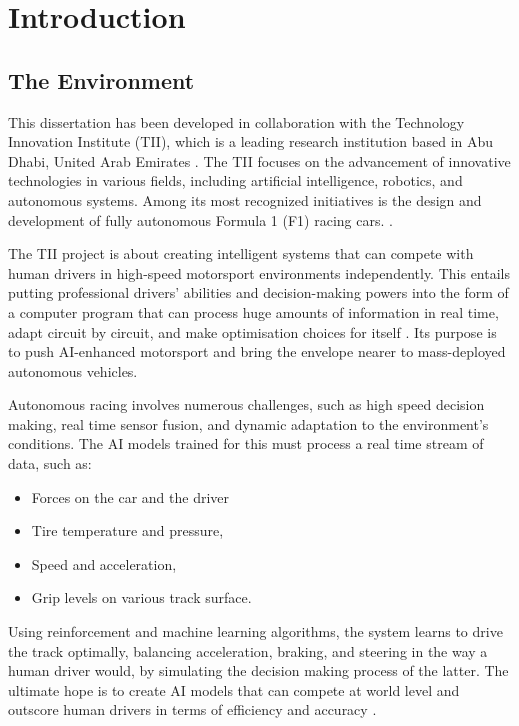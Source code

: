 \documentclass[a4paper,final,12pt]{report}
\begin{document}
\tableofcontents
\listoffigures
\listoftables
\setlength{\parindent}{0pt}

\chapter{Introduction}
\section{The Environment}
This dissertation has been developed in collaboration with the Technology Innovation Institute (TII), which is a leading research institution based in Abu Dhabi, United Arab Emirates \cite{TII}. The TII focuses on the advancement of innovative technologies in various fields, including artificial intelligence, robotics, and autonomous systems. Among its most recognized initiatives is the design and development of fully autonomous Formula 1 (F1) racing cars. \cite{AutonomousRacing}.

The TII project is about creating intelligent systems that can compete with human drivers in high-speed motorsport environments independently. This entails putting professional drivers' abilities and decision-making powers into the form of a computer program that can process huge amounts of information in real time, adapt circuit by circuit, and make optimisation choices for itself \cite{AI_F1}. Its purpose is to push AI-enhanced motorsport and bring the envelope nearer to mass-deployed autonomous vehicles.

Autonomous racing involves numerous challenges, such as high speed decision making, real time sensor fusion, and dynamic adaptation to the environment's conditions. The AI models trained for this must process a real time stream of data, such as:
\begin{itemize}
    \item Forces on the car and the driver
    \item Tire temperature and pressure,
    \item Speed and acceleration,
    \item Grip levels on various track surface.
\end{itemize}
Using reinforcement and machine learning algorithms, the system learns to drive the track optimally, balancing acceleration, braking, and steering in the way a human driver would, by simulating the decision making process of the latter. The ultimate hope is to create AI models that can compete at world level and outscore human drivers in terms of efficiency and accuracy \cite{SelfDriving}.
\end{document}

